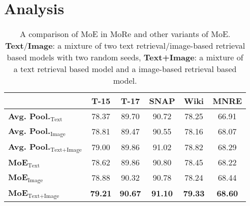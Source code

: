 \documentclass[11pt]{article}
\begin{document}
\section{Analysis}
\begin{table}[t!]
\small
\setlength\tabcolsep{3pt}
\centering
\begin{tabular}{l|ccccc}
\toprule
& T-15 & T-17 & SNAP  & Wiki & MNRE    \\
\midrule
\textbf{Avg. Pool.}$_\text{Text}$       & 78.37     & 89.70     & 90.72 & 78.25      & 66.91 \\
\textbf{Avg. Pool.}$_\text{Image}$      & 78.81     & 89.47     & 90.55 & 78.16      & 68.07 \\
\textbf{Avg. Pool.}$_\text{Text+Image}$ & 79.00     & 89.86     & 91.02 & 78.82      & 68.29 \\
\textbf{MoE}$_\text{Text}$        & 78.62     & 89.86     & 90.80 & 78.45      & 68.22 \\
\textbf{MoE}$_\text{Image}$       & 78.88     & 90.32     & 90.78 & 78.24      & 68.44 \\
\textbf{MoE}$_\text{Text+Image}$            & \textbf{79.21}     & \textbf{90.67}     & \textbf{91.10} & \textbf{79.33}      & \textbf{68.60} \\
\bottomrule
\end{tabular}
\caption{A comparison of MoE in MoRe and other variants of MoE. \textbf{Text}/\textbf{Image}: a mixture of two text retrieval/image-based retrieval based models with two random seeds, \textbf{Text+Image}: a mixture of a text retrieval based model and a image-based retrieval based model.}
\label{tab:moe}
\end{table}
\end{document}
